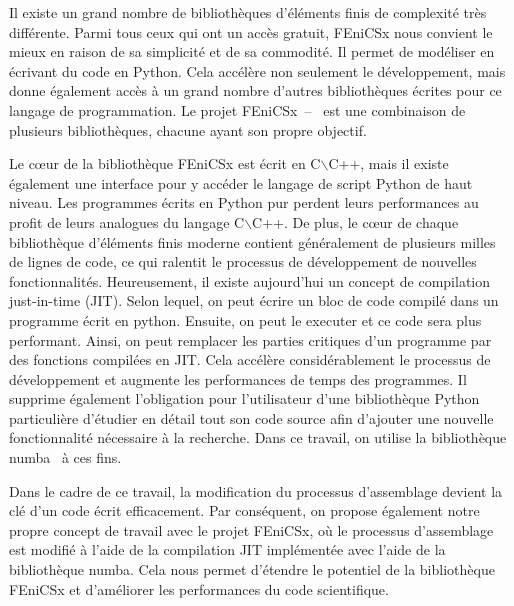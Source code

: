 \documentclass[12pt]{article}
\begin{document}
Il existe un grand nombre de bibliothèques d'éléments finis de complexité très différente. Parmi tous ceux qui ont un accès gratuit, FEniCSx nous convient le mieux en raison de sa simplicité et de sa commodité. Il permet de modéliser en écrivant du code en Python. Cela accélère non seulement le développement, mais donne également accès à un grand nombre d'autres bibliothèques écrites pour ce langage de programmation. Le projet FEniCSx~\parencite{FEniCS2015}--~\parencite{LoggEtal2012} est une combinaison de plusieurs bibliothèques, chacune ayant son propre objectif. 


Le cœur de la bibliothèque FEniCSx est écrit en C$\backslash$C++, mais il existe également une interface pour y accéder le langage de script Python de haut niveau. Les programmes écrits en Python pur perdent leurs performances au profit de leurs analogues du langage C$\backslash$C++. De plus, le cœur de chaque bibliothèque d'éléments finis moderne contient généralement de plusieurs milles de lignes de code, ce qui ralentit le processus de développement de nouvelles fonctionnalités. Heureusement, il existe aujourd'hui un concept de compilation just-in-time (JIT). Selon lequel, on peut écrire un bloc de code compilé dans un programme écrit en python. Ensuite, on peut le executer et ce code sera plus performant. Ainsi, on peut remplacer les parties critiques d'un programme par des fonctions compilées en JIT. Cela accélère considérablement le processus de développement et augmente les performances de temps des programmes. Il supprime également l'obligation pour l'utilisateur d'une bibliothèque Python particulière d'étudier en détail tout son code source afin d'ajouter une nouvelle fonctionnalité nécessaire à la recherche. Dans ce travail, on utilise la bibliothèque numba~\parencite{Numba2015} à ces fins. 

Dans le cadre de ce travail, la modification du processus d'assemblage devient la clé d'un code écrit efficacement. Par conséquent, on propose également notre propre concept de travail avec le projet FEniCSx, où le processus d'assemblage est modifié à l'aide de la compilation JIT implémentée avec l'aide de la bibliothèque numba. Cela nous permet d'étendre le potentiel de la bibliothèque FEniCSx et d'améliorer les performances du code scientifique.
\end{document}
